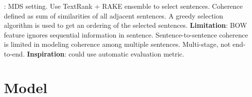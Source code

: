 \documentclass[]{article}
\begin{document}
\citep{nayeem2017extract}: MDS setting. Use TextRank + RAKE ensemble to select sentences. Coherence defined as sum of similarities of all adjacent sentences. A greedy selection algorithm is used to get an ordering of the selected sentences. \textbf{Limitation}: BOW feature ignores sequential information in sentence. Sentence-to-sentence coherence is limited in modeling coherence among multiple sentences. Multi-stage, not end-to-end. \textbf{Inspiration}: could use automatic evaluation metric.








\section{Model}



\end{document}
